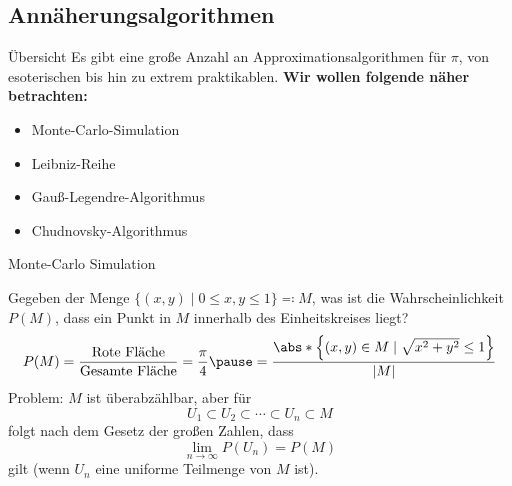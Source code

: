 \documentclass[9pt, t]{beamer}
\begin{document}
\subsection{Annäherungsalgorithmen}

\begin{frame}{Übersicht}
    Es gibt eine große Anzahl an Approximationsalgorithmen für \(\pi\), von
    esoterischen bis hin zu extrem praktikablen.
    \newline\newline
    \textbf{Wir wollen folgende näher betrachten:}
    \begin{itemize}
        \item Monte-Carlo-Simulation
        \item Leibniz-Reihe
        \item Gauß-Legendre-Algorithmus
        \item Chudnovsky-Algorithmus
    \end{itemize}
\end{frame}

\begin{frame}{Monte-Carlo Simulation}
    \begin{minipage}{0.64\textwidth}
        Gegeben der Menge \( \{ (x, y) \mid 0 \le x,y \le 1 \} \eqcolon M \),
        was ist die Wahrscheinlichkeit \( P(M) \), dass ein Punkt in \( M \)
        innerhalb des Einheitskreises liegt?
        \pause
        {%
            \tiny
            \begin{equation*}
                P(M) = \frac{\text{Rote Fläche}}{\text{Gesamte Fläche}}
                = \frac{\pi}{4}
                \pause
                = \frac{\abs*{\set*{ (x, y) \in M \mid \sqrt{x^2 + y^2} \le 1}}}{|M|}
            \end{equation*}
        }
        \pause
        Problem: \( M \) ist überabzählbar\pause, aber für
        \begin{equation*}
            U_1 \subset U_2 \subset \cdots \subset U_n \subset M
        \end{equation*}
        folgt nach dem Gesetz der großen Zahlen, dass
        \begin{equation*}
            \lim_{n \to \infty} P(U_n) = P(M)
        \end{equation*}
        gilt (wenn \( U_n \) eine uniforme Teilmenge von \( M \) ist).
    \end{minipage}
    \begin{minipage}{0.35\textwidth}
        \begin{figure}[H]
            
        \end{figure}
    \end{minipage}
\end{frame}
\end{document}
